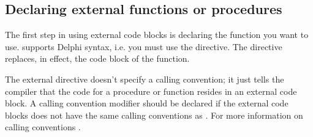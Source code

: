 \subsection{Declaring external functions or procedures}
\label{se:ExternalFunction}

The first step in using external code blocks is declaring the function you
want to use. \fpc supports Delphi syntax, i.e. you must use the
 directive. The  directive replaces, in effect,
the code block of the function.

The external directive doesn't specify a calling convention; it just tells
the compiler that the code for a procedure or function resides in an
external code block. A calling convention modifier should be declared
if the external code blocks does not have the same calling conventions
as \fpc. For more information on calling conventions
.

